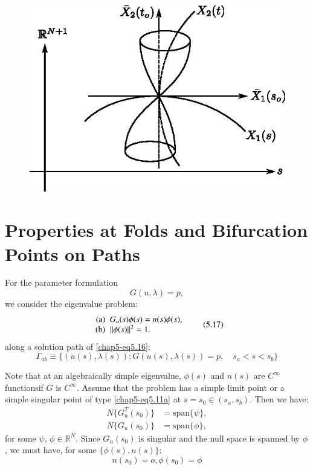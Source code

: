 \begin{figure}[H]
\centering
\includegraphics{vol79-fig/fig79-27.eps}
\smallskip
\caption{}
\label{chap5-fig5.3}
\end{figure}\pageoriginale

\setcounter{section}{14}
\section{Properties at Folds and Bifurcation Points on
  Paths}\label{chap5-sec5.15}%

For the parameter formulation
\begin{equation*}
G(u,\lambda)=p, \tag{5.16}\label{chap5-eq5.16}
\end{equation*}
we consider the eigenvalue problem:
\begin{equation*}
\begin{array}{r@{\;\;}l}
\text{(a)} & G_u(s)\phi(s)=n(s)\phi(s),\\
\text{(b)} & || \phi (s) ||^2 =1.
\end{array}\tag{5.17}\label{chap5-eq5.17}
\end{equation*}
along a solution path of \eqref{chap5-eq5.16}:
$$
\Gamma_{ab} \equiv \{(u(s),\lambda(s)):G(u(s),\lambda(s))=p, \quad s_a
< s < s_b\} 
$$

Note that at an algebraically simple eigenvalue, $\phi(s)$ and $n(s)$
are $C^\infty$ functions\pageoriginale if $G$ is $C^{\infty}$. Assume
that the problem has a simple limit point or a simple singular point of type
\eqref{chap5-eq5.11a} at $s = s_{0} \in (s_{a}, s_{b})$. Then we have:  
\begin{align*}
N \{G^{T}_{u}(s_{0})\} &  = \text{span} \{\psi\}, \\
N \{G_{u}(s_{0})\} &  = \text{span} \{\phi\},
\end{align*}
for some $\psi$, $\phi \in \mathbb{R}^{N}$. Since $G_{u}(s_{0})$ is
singular and the null space is spanned by $\phi$, we must have, for
some $\{\phi (s), n (s)\}$: 
$$
n(s_{0}) = o, \phi (s_{0}) = \phi
$$

